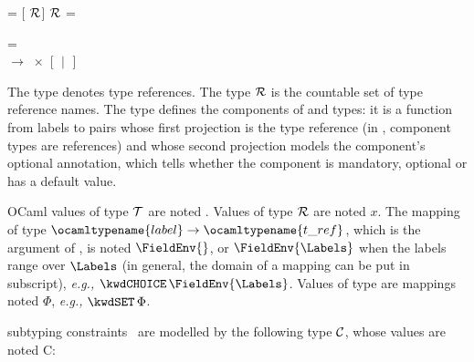 \noindent
{}  = \textsf{[}\TRef{}
 ${\cal R}$\textsf{]} 
 ${\cal R}$ = 

\noindent 
{}  =\\
\hspace*{2mm} 
 $\!\rightarrow\!$ 
$\!\times\!$ 
\textsf{[}\kwdOPTIONAL{} $\!\mid\!$ \kwdDEFAULT{} 
\textsf{]} 

\smallskip

\noindent
The type  denotes type references. The type
${\cal R}$ is the countable set of type reference names.  The type
 defines the components of \kwdSET{} and
\kwdSEQUENCE{} \core types: it is a function from labels to pairs
whose first projection is the type reference (in \core, component
types are references) and whose second projection models the
component's optional annotation, which tells whether the component is
mandatory, optional or has a default value.

OCaml values of type ${\cal T}$ are noted \T. Values of type ${\cal
R}$ are noted $x$. The mapping of type $\ocamltypename{label}
\rightarrow \ocamltypename{t\_ref}$, which is the argument of
\kwdCHOICE, is noted $\FieldEnv{}$, or $\FieldEnv{\Labels}$ when the
labels range over $\Labels$ (in general, the domain of a mapping can
be put in subscript), \emph{e.g.,} $\kwdCHOICE \, \FieldEnv{\Labels}$. Values
of type  are mappings noted $\Phi$,
\emph{e.g.,} $\kwdSET \, \Phi$.

\ASN subtyping constraints~\cite[\S{45}]{X.680:2002} are modelled
by the following type ${\cal C}$, whose values are noted C:

\smallskip

